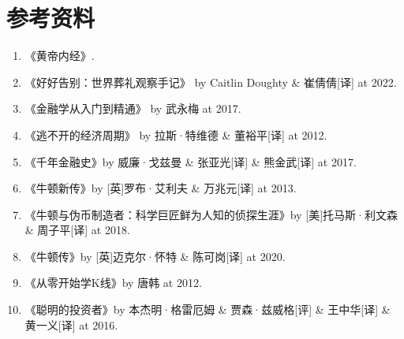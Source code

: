 \documentclass[12pt,oneside]{book}
\begin{document}
\chapter{参考资料}
\begin{enumerate}
\item 《黄帝内经》.
\item 《好好告别：世界葬礼观察手记》 by Caitlin Doughty \& 崔倩倩[译] at 2022. 
\item 《金融学从入门到精通》 by 武永梅 at 2017.
\item 《逃不开的经济周期》 by 拉斯·特维德 \& 董裕平[译] at 2012.
\item 《千年金融史》by 威廉·戈兹曼  \& 张亚光[译] \& 熊金武[译] at 2017.
\item 《牛顿新传》by [英]罗布·艾利夫 \& 万兆元[译] at 2013.
\item 《牛顿与伪币制造者：科学巨匠鲜为人知的侦探生涯》by [美]托马斯·利文森 \& 周子平[译] at 2018. 
\item 《牛顿传》by [英]迈克尔·怀特 \& 陈可岗[译] at 2020.
\item 《从零开始学K线》by 唐韩 at 2012. 
\item 《聪明的投资者》by 本杰明·格雷厄姆 \& 贾森·兹威格[评] \& 王中华[译] \& 黄一义[译] at 2016.
\end{enumerate}

\end{document}
